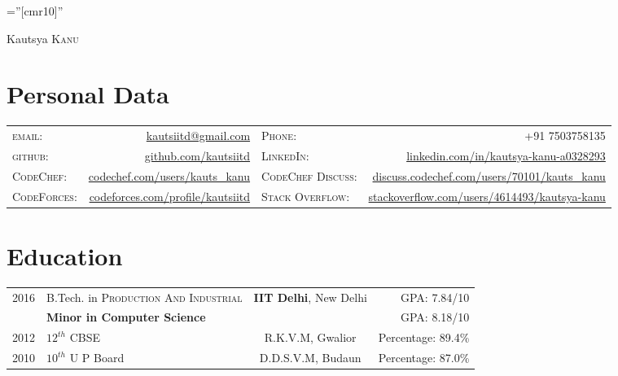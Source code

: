 \documentclass[a4paper,10pt]{article}
\begin{document}

\pagestyle{empty} %

\font\fb=''[cmr10]'' %

\par{
		{\Huge Kautsya \textsc{Kanu}
	}\bigskip\par}

\section{Personal Data}

\begin{tabular}{lr lr}
    \textsc{email:}	& \href{mailto:kautsiitd@gmail.com}{kautsiitd@gmail.com} & \textsc{Phone:}     & +91 7503758135\\
    \textsc{github:}	& \href{https://github.com/kautsiitd}{github.com/kautsiitd} & \textsc{LinkedIn:}     & \href{https://www.linkedin.com/in/kautsya-kanu-a0328293}{linkedin.com/in/kautsya-kanu-a0328293}\\
     \textsc{CodeChef:}     & \href{https://www.codechef.com/users/kauts\_kanu}{codechef.com/users/kauts\_kanu} & \textsc{CodeChef Discuss:}     & \href{https://discuss.codechef.com/users/70101/kauts\_kanu}{discuss.codechef.com/users/70101/kauts\_kanu}\\
    \textsc{CodeForces:}     & \href{http://codeforces.com/profile/kautsiitd}{codeforces.com/profile/kautsiitd} & \textsc{Stack Overflow:}     & \href{https://stackoverflow.com/users/4614493/kautsya-kanu?tab=profile}{stackoverflow.com/users/4614493/kautsya-kanu}\\
\end{tabular}

\section{Education}
\begin{tabular*}{\textwidth}{c @{\extracolsep{\fill}} lcr}	
 2016 & B.Tech. in \textsc{Production And Industrial} & \textbf{IIT Delhi}, New Delhi & GPA: 7.84/10\\
& \textbf{Minor in Computer Science} & & GPA: 8.18/10\\

2012 & $12^{th}$ CBSE & \textsc{R.K.V.M}, Gwalior & Percentage: 89.4\% \\

2010 & $10^{th}$ U P Board & \textsc{D.D.S.V.M}, Budaun & Percentage: 87.0\% \\
\end{tabular*}
\end{document}
